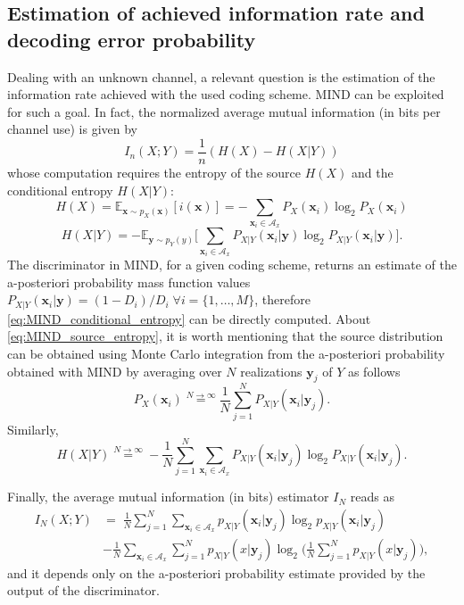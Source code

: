 \subsection{Estimation of achieved information rate and decoding error probability}
\label{subsec:mind_estimation}
Dealing with an unknown channel, a relevant question is the estimation of the information rate achieved with the used coding scheme. MIND can be exploited for such a goal. In fact, the normalized average mutual information (in bits per channel use) is given by \cite{Gallager1968}
\begin{equation}
    I_n(X;Y) = \frac{1}{n}(H(X)-H(X|Y))
\end{equation}
whose computation requires the entropy of the source $H(X)$ and the conditional entropy $H(X|Y)$:
\begin{equation}
\label{eq:MIND_source_entropy}
H(X) = \mathbb{E}_{\mathbf{x} \sim p_X(\mathbf{x})}[i(\mathbf{x})] = -\sum_{\mathbf{x}_i \in \mathcal{A}_x}{P_X(\mathbf{x}_i)\log_2 P_X(\mathbf{x}_i)}
\end{equation}
\begin{equation}
\label{eq:MIND_conditional_entropy}
H(X|Y) = -\mathbb{E}_{\mathbf{y} \sim p_Y(y)}\biggl[\sum_{\mathbf{x}_i \in \mathcal{A}_x}{P_{X|Y}(\mathbf{x}_i|\mathbf{y})\log_2 P_{X|Y}(\mathbf{x}_i|\mathbf{y})}\biggr].
\end{equation}
The discriminator in MIND, for a given coding scheme, returns an estimate of the a-posteriori probability mass function values $P_{X|Y}(\mathbf{x}_i|\mathbf{y})=(1-D_i)/D_i \; \forall i=\{1,\dots,M\}$, therefore \eqref{eq:MIND_conditional_entropy} can be directly computed. About \eqref{eq:MIND_source_entropy}, it is worth mentioning that the source distribution can be obtained using Monte Carlo integration from the a-posteriori probability obtained with MIND by averaging over $N$ realizations $\mathbf{y}_j$ of $Y$ as follows 
\begin{equation}
\label{eq:MIND_monte-carlo_source}
P_X(\mathbf{x}_i) \stackrel{N\to \infty}{=} \frac{1}{N}\sum_{j=1}^{N}{P_{X|Y}(\mathbf{x}_i|\mathbf{y}_j)}.
\end{equation}
Similarly,
\begin{equation}
H(X|Y) \stackrel{N\to \infty}{=} -\frac{1}{N} \sum_{j=1}^{N}{\sum_{\mathbf{x}_i \in \mathcal{A}_x}{P_{X|Y}(\mathbf{x}_i|\mathbf{y}_j)\log_2 P_{X|Y}(\mathbf{x}_i|\mathbf{y}_j)}}.
\end{equation}

Finally, the average mutual information (in bits) estimator $I_N$ reads as
\begin{align}
I_N(X;Y) & = \;  \frac{1}{N} \sum_{j=1}^{N}{\sum_{\mathbf{x}_i \in \mathcal{A}_x}{p_{X|Y}(\mathbf{x}_i|\mathbf{y}_j)\log_2 p_{X|Y}(\mathbf{x}_i|\mathbf{y}_j)}}  \nonumber \\ 
    & -\frac{1}{N}\sum_{\mathbf{x}_i \in \mathcal{A}_x}{\sum_{j=1}^{N}{p_{X|Y}(x|\mathbf{y}_j)}\log_2 \biggl(\frac{1}{N} \sum_{j=1}^{N}{p_{X|Y}(x|\mathbf{y}_j)}\biggr)},
\end{align}
and it depends only on the a-posteriori probability estimate provided by the output of the discriminator.

